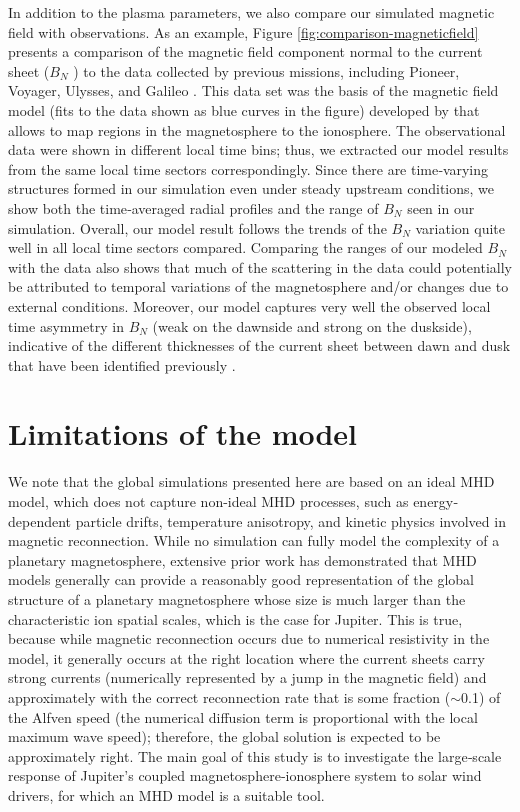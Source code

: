 In addition to the plasma parameters, we also compare our simulated magnetic field with observations. As an example, Figure \ref{fig:comparison-magneticfield} presents a comparison of the magnetic field component normal to the current sheet ($B_N$ ) to the data collected by previous missions, including Pioneer, Voyager, Ulysses, and Galileo \cite{Vogt2011a}. This data set was the basis of the magnetic field model (fits to the data shown as blue curves in the figure) developed by \cite{Vogt2011a} that allows to map regions in the magnetosphere to the ionosphere. The observational data were shown in different local time bins; thus, we extracted our model results from the same local time sectors correspondingly. Since there are time‐varying structures formed in our simulation even under steady upstream conditions, we show both the time‐averaged radial profiles and the range of $B_N$ seen in our simulation. Overall, our model result follows the trends of the $B_N$ variation quite well in all local time sectors compared. Comparing the ranges of our modeled $B_N$ with the data also shows that much of the scattering in the data could potentially be attributed to temporal variations of the magnetosphere and/or changes due to external conditions. Moreover, our model captures very well the observed local time asymmetry in $B_N$ (weak on the dawnside and strong on the duskside), indicative of the different thicknesses of the current sheet between dawn and dusk that have been identified previously \cite{Khurana2005,Kivelson2002a}.

\section{Limitations of the model}
We note that the global simulations presented here are based on an ideal MHD model, which does not capture non-ideal MHD processes, such as energy‐dependent particle drifts, temperature anisotropy, and kinetic physics involved in magnetic reconnection. While no simulation can fully model the complexity of a planetary magnetosphere, extensive prior work has demonstrated that MHD models generally can provide a reasonably good representation of the global structure of a planetary magnetosphere whose size is much larger than the characteristic ion spatial scales, which is the case for Jupiter. This is true, because while magnetic reconnection occurs due to numerical resistivity in the model, it generally occurs at the right location where the current sheets carry strong currents (numerically represented by a jump in the magnetic field) and approximately with the correct reconnection rate that is some fraction ($\sim$0.1) of the Alfven speed (the numerical diffusion term is proportional with the local maximum wave speed); therefore, the global solution is expected to be approximately right. The main goal of this study is to investigate the large‐scale response of Jupiter's coupled magnetosphere‐ionosphere system to solar wind drivers, for which an MHD model is a suitable tool.

